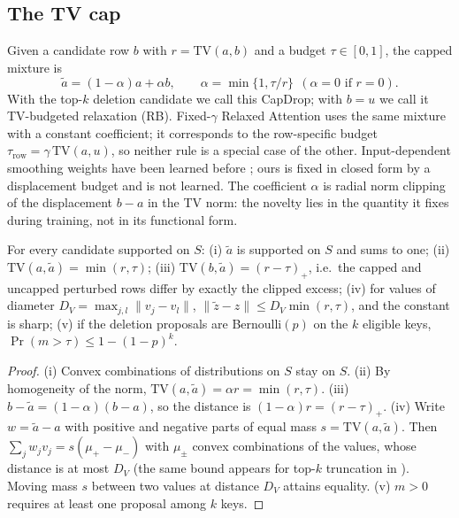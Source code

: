 \subsection{The TV cap}
Given a candidate row $b$ with $r=\mathrm{TV}(a,b)$ and a budget $\tau\in[0,1]$, the capped mixture is
\begin{equation}\label{eq:cap}
 \tilde a=(1-\alpha)a+\alpha b,\qquad \alpha=\min\{1,\tau/r\}\ \ (\alpha=0\text{ if }r=0).
\end{equation}
With the top-$k$ deletion candidate we call this CapDrop; with $b=u$ we call it TV-budgeted relaxation (RB).
Fixed-$\gamma$ Relaxed Attention \citep{lohrenz2021relaxed,lohrenz2023relaxed} uses the same mixture with a
constant coefficient; it corresponds to the row-specific budget $\tau_{\mathrm{row}}=\gamma\,\mathrm{TV}(a,u)$, so
neither rule is a special case of the other. Input-dependent smoothing weights have been learned before
\citep{maekaku2022attention}; ours is fixed in closed form by a displacement budget and is not learned. The
coefficient $\alpha$ is radial norm clipping \citep{koloskova2023revisiting} of the displacement $b-a$ in the
TV norm: the novelty lies in the quantity it fixes during training, not in its functional form.

\begin{proposition}\label{prop:cap}
For every candidate supported on $S$:
(i) $\tilde a$ is supported on $S$ and sums to one;
(ii) $\mathrm{TV}(a,\tilde a)=\min(r,\tau)$;
(iii) $\mathrm{TV}(b,\tilde a)=(r-\tau)_+$, i.e.\ the capped and uncapped perturbed rows differ by exactly the clipped excess;
(iv) for values of diameter $D_V=\max_{j,l}\lVert v_j-v_l\rVert$, $\lVert\tilde z-z\rVert\le D_V\min(r,\tau)$, and the constant is sharp;
(v) if the deletion proposals are Bernoulli$(p)$ on the $k$ eligible keys, $\Pr(m>\tau)\le 1-(1-p)^{k}$.
\end{proposition}
\begin{proof}
(i) Convex combinations of distributions on $S$ stay on $S$. (ii) By homogeneity of the norm,
$\mathrm{TV}(a,\tilde a)=\alpha r=\min(r,\tau)$. (iii) $b-\tilde a=(1-\alpha)(b-a)$, so the distance is
$(1-\alpha)r=(r-\tau)_+$. (iv) Write $w=\tilde a-a$ with positive and negative parts of equal mass
$s=\mathrm{TV}(a,\tilde a)$. Then $\sum_jw_jv_j=s(\mu_+-\mu_-)$ with $\mu_\pm$ convex combinations of the values,
whose distance is at most $D_V$ (the same bound appears for top-$k$ truncation in \citet{tzachristas2025topk}).
Moving mass $s$ between two values at distance $D_V$ attains equality.
(v) $m>0$ requires at least one proposal among $k$ keys.
\end{proof}

